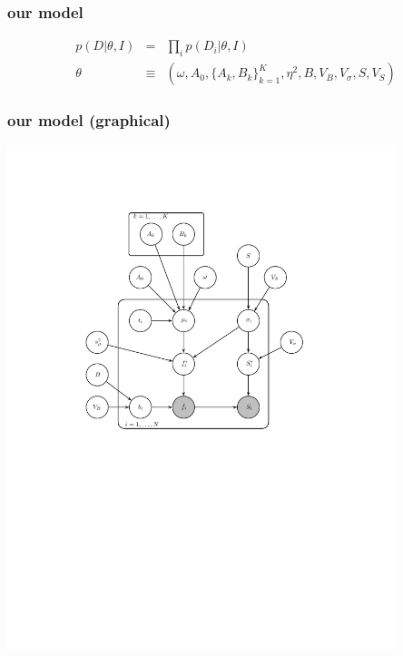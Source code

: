\documentclass[pdftex]{beamer}
\begin{document}
\begin{frame}
  \frametitle{our model}
\begin{eqnarray}\displaystyle
p(D|\theta,I) &=& \prod_i p(D_i|\theta,I)
\nonumber \\
\theta &\equiv& (\omega, A_0, \{A_k, B_k\}_{k=1}^K, \eta^2, B, V_B, V_{\sigma}, S, V_S)
\nonumber
\end{eqnarray}
\end{frame}

\begin{frame}
  \frametitle{our model (graphical)}
  \includegraphics[trim=3cm 12cm 5cm 3cm, clip=true, width=0.85\textwidth]{../tex/gm/gm.pdf}
\end{frame}
\end{document}
